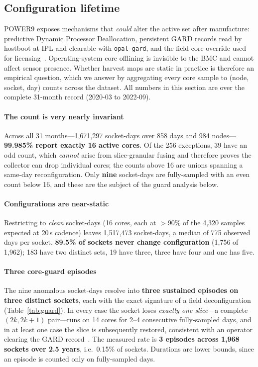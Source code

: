 \documentclass[10pt,conference]{IEEEtran}
\begin{document}
\subsection{Configuration lifetime}
\label{sec:lifecycle}
POWER9 exposes mechanisms that \emph{could} alter the active set after manufacture: predictive
Dynamic Processor Deallocation, persistent GARD records read by hostboot at IPL and clearable with
\texttt{opal-gard}, and the field core override used for licensing~\cite{ibm_deconfig,skiboot_gard}.
Operating-system core offlining is invisible to the BMC and cannot affect sensor presence. Whether
harvest maps are static in practice is therefore an empirical question, which we answer by
aggregating every core sample to (node, socket, day) counts across the dataset.
All numbers in this section are over the complete 31-month record (2020-03 to 2022-09).

\paragraph{The count is very nearly invariant} Across all 31 months---1{,}671{,}297 socket-days
over 858 days and 984 nodes---\textbf{99.985\% report exactly 16 active cores}. Of the 256
exceptions, 39 have an odd count, which \emph{cannot} arise from slice-granular fusing and
therefore proves the collector can drop individual cores; the counts above 16 are unions spanning a
same-day reconfiguration. Only \textbf{nine} socket-days are fully-sampled with an even count below
16, and these are the subject of the guard analysis below.

\paragraph{Configurations are near-static} Restricting to \emph{clean} socket-days (16 cores, each
at $>$90\% of the 4{,}320 samples expected at 20\,s cadence) leaves 1{,}517{,}473 socket-days, a
median of 775 observed days per socket. \textbf{89.5\% of sockets never change configuration}
(1{,}756 of 1{,}962); 183 have two distinct sets, 19 have three, three have four and one has five.

\paragraph{Three core-guard episodes} The nine anomalous socket-days resolve into
\textbf{three sustained episodes on three distinct sockets}, each with the exact signature of a
field deconfiguration (Table~\ref{tab:guard}). In every case the socket loses \emph{exactly one
slice}---a complete $(2k,2k{+}1)$ pair---runs on 14 cores for 2--4 consecutive fully-sampled days,
and in at least one case the slice is subsequently restored, consistent with an operator clearing
the GARD record~\cite{skiboot_gard}. The measured rate is \textbf{3 episodes across 1{,}968
sockets over 2.5 years}, i.e.\ 0.15\% of sockets. Durations are lower bounds, since an episode is
counted only on fully-sampled days.
\end{document}
